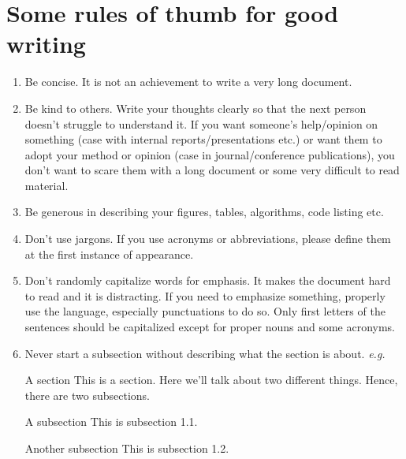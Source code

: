 \documentclass{article}
\begin{document}
\section*{Some rules of thumb for good writing}
\begin{enumerate}
    \item Be concise. It is not an achievement to write a very long document. 
    \item Be kind to others. Write your thoughts clearly so that the next person doesn't struggle to understand it. If you want someone's help/opinion on something (case with internal reports/presentations etc.) or want them to adopt your method or opinion (case in journal/conference publications), you don't want to scare them with a long document or some very difficult to read material. 
    \item Be generous in describing your figures, tables, algorithms, code listing etc.
    \item Don't use jargons. If you use acronyms or abbreviations, please define them at the first instance of appearance.
    \item Don't randomly capitalize words for emphasis. It makes the document hard to read and it is distracting. If you need to emphasize something, properly use the language, especially punctuations to do so. Only first letters of the sentences should be capitalized except for proper nouns and some acronyms.
    \item Never start a subsection without describing what the section is about. \emph{e.g.}

    \begin{section}{A section}
        This is a section. Here we'll talk about two different things. Hence, there are two subsections.
        \begin{subsection}{A subsection}
            This is subsection 1.1.
        \end{subsection}
        \begin{subsection}{Another subsection}
            This is subsection 1.2.
        \end{subsection}
    \end{section}



\end{enumerate}
\end{document}
